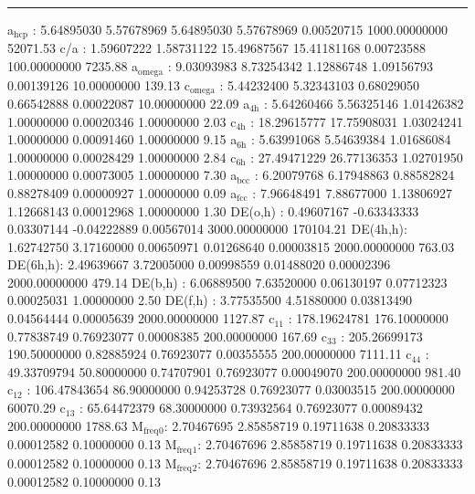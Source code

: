 \documentclass[11pt]{article}
\begin{document}
\noindent\rule{\textwidth}{0.5pt}
a\(_{\text{hcp}}\)   :   5.64895030   5.57678969   5.64895030   5.57678969   0.00520715 1000.00000000     52071.53
c/a     :   1.59607222   1.58731122  15.49687567  15.41181168   0.00723588 100.00000000      7235.88
a\(_{\text{omega}}\) :   9.03093983   8.73254342   1.12886748   1.09156793   0.00139126  10.00000000       139.13
c\(_{\text{omega}}\) :   5.44232400   5.32343103   0.68029050   0.66542888   0.00022087  10.00000000        22.09
a\(_{\text{4h}}\)    :   5.64260466   5.56325146   1.01426382   1.00000000   0.00020346   1.00000000         2.03
c\(_{\text{4h}}\)    :  18.29615777  17.75908031   1.03024241   1.00000000   0.00091460   1.00000000         9.15
a\(_{\text{6h}}\)    :   5.63991068   5.54639384   1.01686084   1.00000000   0.00028429   1.00000000         2.84
c\(_{\text{6h}}\)    :  27.49471229  26.77136353   1.02701950   1.00000000   0.00073005   1.00000000         7.30
a\(_{\text{bcc}}\)   :   6.20079768   6.17948863   0.88582824   0.88278409   0.00000927   1.00000000         0.09
a\(_{\text{fcc}}\)   :   7.96648491   7.88677000   1.13806927   1.12668143   0.00012968   1.00000000         1.30
DE(o,h) :   0.49607167  -0.63343333   0.03307144  -0.04222889   0.00567014 3000.00000000    170104.21
DE(4h,h):   1.62742750   3.17160000   0.00650971   0.01268640   0.00003815 2000.00000000       763.03
DE(6h,h):   2.49639667   3.72005000   0.00998559   0.01488020   0.00002396 2000.00000000       479.14
DE(b,h) :   6.06889500   7.63520000   0.06130197   0.07712323   0.00025031   1.00000000         2.50
DE(f,h) :   3.77535500   4.51880000   0.03813490   0.04564444   0.00005639 2000.00000000      1127.87
c\(_{\text{11}}\)    : 178.19624781 176.10000000   0.77838749   0.76923077   0.00008385 200.00000000       167.69
c\(_{\text{33}}\)    : 205.26699173 190.50000000   0.82885924   0.76923077   0.00355555 200.00000000      7111.11
c\(_{\text{44}}\)    :  49.33709794  50.80000000   0.74707901   0.76923077   0.00049070 200.00000000       981.40
c\(_{\text{12}}\)    : 106.47843654  86.90000000   0.94253728   0.76923077   0.03003515 200.00000000     60070.29
c\(_{\text{13}}\)    :  65.64472379  68.30000000   0.73932564   0.76923077   0.00089432 200.00000000      1788.63
M\(_{\text{freq}}\)\(_{\text{0}}\):   2.70467695   2.85858719   0.19711638   0.20833333   0.00012582   0.10000000         0.13
M\(_{\text{freq}}\)\(_{\text{1}}\):   2.70467696   2.85858719   0.19711638   0.20833333   0.00012582   0.10000000         0.13
M\(_{\text{freq}}\)\(_{\text{2}}\):   2.70467696   2.85858719   0.19711638   0.20833333   0.00012582   0.10000000         0.13
\end{document}

